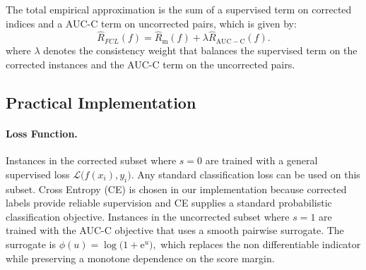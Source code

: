 \documentclass[10pt,twocolumn,letterpaper]{article}
\begin{document}
The total empirical approximation is the sum of a supervised term on corrected indices and a AUC-C term on uncorrected pairs, which is given by:
\begin{equation}
    \widehat{R}_{FCL}(f) = \widehat{R}_{\mathrm{m}}(f) + \lambda \widehat{R}_{\mathrm{AUC-C}}(f).
\end{equation}
where $\lambda$ denotes the consistency weight that balances the supervised term on the corrected instances and the AUC-C term on the uncorrected pairs.


\subsection{Practical Implementation}
\paragraph{Loss Function.}
Instances in the corrected subset where $s=0$ are trained with a general supervised loss $\mathcal{L}\big(f(x_{i}),y_{i}\big)$. Any standard classification loss can be used on this subset. Cross Entropy (CE) is chosen in our implementation because corrected labels provide reliable supervision and CE supplies a standard probabilistic classification objective. Instances in the uncorrected subset where $s=1$ are trained with the AUC-C objective that uses a smooth pairwise surrogate. The surrogate is
\(
\phi(u)=\log\big(1+\mathrm{e}^{u}\big),
\)
which replaces the non differentiable indicator while preserving a monotone dependence on the score margin.
\end{document}

